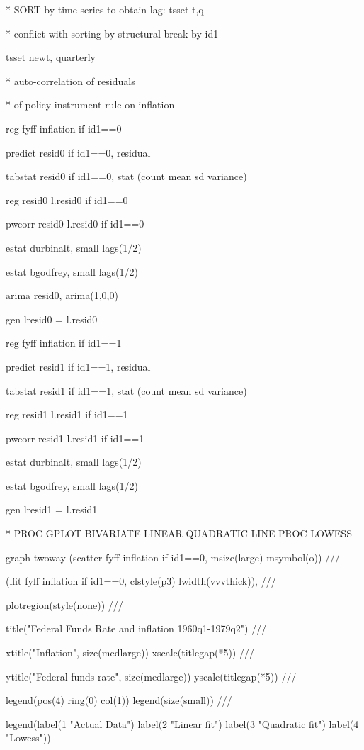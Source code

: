 \documentclass[12pt,a4paper]{article}%
\begin{document}
* SORT by time-series to obtain lag: tsset t,q

* conflict with sorting by structural break by id1

tsset newt, quarterly

* auto-correlation of residuals

* of policy instrument rule on inflation

reg fyff inflation if id1==0

predict resid0 if id1==0, residual

tabstat resid0 if id1==0, stat (count mean sd variance)

reg resid0 l.resid0 if id1==0

pwcorr resid0 l.resid0 if id1==0

estat durbinalt, small lags(1/2)

estat bgodfrey, small lags(1/2)

arima resid0, arima(1,0,0)

gen lresid0 = l.resid0

reg fyff inflation if id1==1

predict resid1 if id1==1, residual

tabstat resid1 if id1==1, stat (count mean sd variance)

reg resid1 l.resid1 if id1==1

pwcorr resid1 l.resid1 if id1==1

estat durbinalt, small lags(1/2)

estat bgodfrey, small lags(1/2)

gen lresid1 = l.resid1

* PROC GPLOT BIVARIATE LINEAR QUADRATIC LINE PROC LOWESS

graph twoway (scatter fyff inflation if id1==0, msize(large) msymbol(o)) ///

(lfit fyff inflation if id1==0, clstyle(p3) lwidth(vvvthick)), ///

plotregion(style(none)) ///

title("Federal Funds Rate and inflation 1960q1-1979q2") ///

xtitle("Inflation", size(medlarge)) xscale(titlegap(*5)) ///

ytitle("Federal funds rate", size(medlarge)) yscale(titlegap(*5)) ///

legend(pos(4) ring(0) col(1)) legend(size(small)) ///

legend(label(1 "Actual Data") label(2 "Linear fit") label(3 "Quadratic fit")
label(4 "Lowess"))
\end{document}
